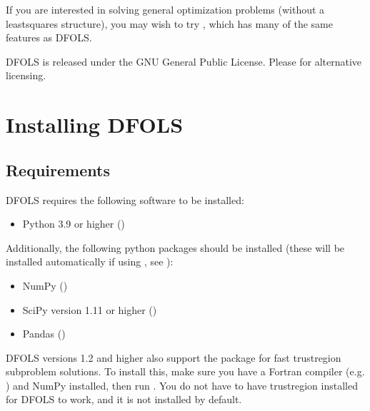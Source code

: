 \documentclass[letterpaper,10pt,english]{sphinxmanual}
\begin{document}
\sphinxAtStartPar
If you are interested in solving general optimization problems (without a least\sphinxhyphen{}squares structure), you may wish to try , which has many of the same features as DFO\sphinxhyphen{}LS.

\sphinxAtStartPar
DFO\sphinxhyphen{}LS is released under the GNU General Public License. Please  for alternative licensing.

\sphinxstepscope


\chapter{Installing DFO\sphinxhyphen{}LS}
\label{\detokenize{install:installing-dfo-ls}}\label{\detokenize{install::doc}}

\section{Requirements}
\label{\detokenize{install:requirements}}
\sphinxAtStartPar
DFO\sphinxhyphen{}LS requires the following software to be installed:
\begin{itemize}
\item {} 
\sphinxAtStartPar
Python 3.9 or higher ()

\end{itemize}

\sphinxAtStartPar
Additionally, the following python packages should be installed (these will be installed automatically if using , see {\hyperref[\detokenize{install:installation-using-pip}]{}}):
\begin{itemize}
\item {} 
\sphinxAtStartPar
NumPy ()

\item {} 
\sphinxAtStartPar
SciPy version 1.11 or higher ()

\item {} 
\sphinxAtStartPar
Pandas ()

\end{itemize}

\sphinxAtStartPar
{} DFO\sphinxhyphen{}LS versions 1.2 and higher also support the  package for fast trust\sphinxhyphen{}region subproblem solutions. To install this, make sure you have a Fortran compiler (e.g. ) and NumPy installed, then run . You do not have to have trustregion installed for DFO\sphinxhyphen{}LS to work, and it is not installed by default.
\end{document}
